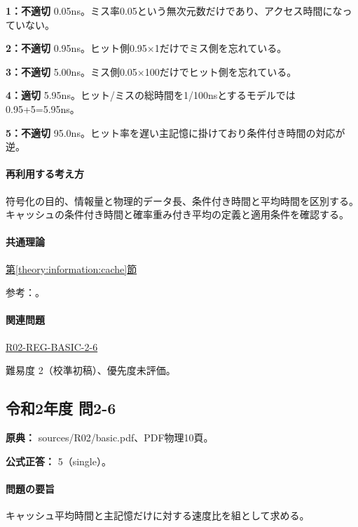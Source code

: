 \noindent\textbf{1：不適切} 0.05ns。ミス率0.05という無次元数だけであり、アクセス時間になっていない。\par

\noindent\textbf{2：不適切} 0.95ns。ヒット側0.95×1だけでミス側を忘れている。\par

\noindent\textbf{3：不適切} 5.00ns。ミス側0.05×100だけでヒット側を忘れている。\par

\noindent\textbf{4：適切} 5.95ns。ヒット/ミスの総時間を1/100nsとするモデルでは0.95+5=\allowbreak{}5.95ns。\par

\noindent\textbf{5：不適切} 95.0ns。ヒット率を遅い主記憶に掛けており条件付き時間の対応が逆。\par

\paragraph{再利用する考え方} 符号化の目的、情報量と物理的データ長、条件付き時間と平均時間を区別する。キャッシュの条件付き時間と確率重み付き平均の定義と適用条件を確認する。

\paragraph{共通理論} \hyperref[theory:information:cache]{第\ref*{theory:information:cache}節}

\par 参考：\cite{info_cache}。

\paragraph{関連問題} \hyperref[q:r02-reg-basic-2-6]{R02-REG-BASIC-2-6}

\par 難易度 2（校準初稿）、優先度未評価。

\subsection{令和2年度 問2-6}
\label{q:r02-reg-basic-2-6}

\noindent\textbf{原典：} sources/R02/basic.pdf、PDF物理10頁。

\textbf{公式正答：} 5（single）。

\paragraph{問題の要旨} キャッシュ平均時間と主記憶だけに対する速度比を組として求める。

